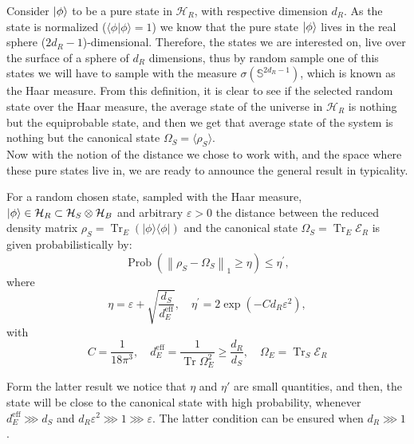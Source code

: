 \indent Consider $\mathinner{|{\phi}\rangle}$ to be a pure state in $\mathcal{H}_R$, with respective dimension $d_R$. As the state is normalized ($\langle\phi | \phi\rangle=1$) we know that the pure state $\mathinner{|{\phi}\rangle}$ lives in the real sphere ($2d_R-1$)-dimensional. Therefore, the states we are interested on, live over the surface of a sphere of $d_R$ dimensions, thus by random sample one of this states we will have to sample with the measure $\sigma(\mathbb{S}^{2d_R-1})$, which is known as the Haar measure. From this definition, it is clear to see if the selected random state over the Haar measure, the average state of the universe in $\mathcal{H}_R$ is nothing but the equiprobable state, and then we get that average state of the system is nothing but the canonical state $\Omega_S = \langle \rho_S\rangle$.\\

\indent Now with the notion of the distance we chose to work with, and the space where these pure states live in, we are ready to announce the general result in typicality.\\
\begin{theorem}
For a random chosen state, sampled with the Haar measure, $\mathinner{|{\phi}\rangle}\in\mathcal{H}_R\subset\mathcal{H}_S\otimes\mathcal{H}_B$ and arbitrary $\varepsilon >0$ the distance between the reduced density matrix $\rho_{S}=\operatorname{Tr}_{E}(|\phi\rangle\langle\phi|)$ and the canonical state $\Omega_S=\operatorname{Tr}_E\mathcal{E}_R$ is given probabilistically by:
\begin{equation}
\operatorname{Prob}\left(\left\|\rho_{S}-\Omega_{S}\right\|_{1} \geq \eta\right) \leq \eta^{\prime},
\label{CH1:Typicality_result_1}
\end{equation}
where
\begin{equation}
\eta=\varepsilon+\sqrt{\frac{d_{S}}{d_{E}^{\mathrm{eff}}}}, \quad \eta^{\prime}=2 \exp \left(-C d_{R} \varepsilon^{2}\right),
\label{CH1:Typicality_result_1_1}
\end{equation}
with
\begin{equation}
C=\frac{1}{18 \pi^{3}}, \quad d_{E}^{\mathrm{eff}}=\frac{1}{\operatorname{Tr} \Omega_{E}^{2}}\geq \frac{d_R}{d_S}, \quad \Omega_{E}=\operatorname{Tr}_{S} \mathcal{E}_{R}
\label{CH1:Typicality_result_1_2}
\end{equation}
\end{theorem}

\indent Form the latter result we notice that $\eta$ and $\eta'$ are small quantities, and then, the state will be close to the canonical state with high probability, whenever $d^{\mathrm{eff}}_E\ggg d_S$ and $d_R\varepsilon^2\ggg 1 \ggg \varepsilon$. The latter condition can be ensured when $d_R\ggg 1$.\\


